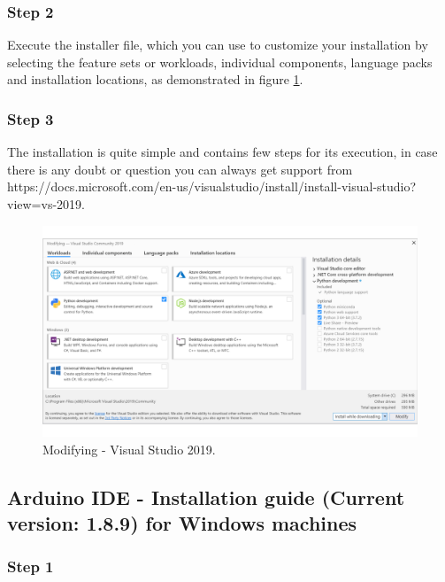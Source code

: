 \begin{refsection}
	
	\subsubsection{Step 2}
	
	Execute the installer file, which you can use to customize your installation by selecting the feature sets or workloads, individual components, language packs and installation locations, as demonstrated in figure \ref{vstudioWorkloads}.
	
	
	
	\subsubsection{Step 3}
	
	The installation is quite simple and contains few steps for its execution, in case there is any doubt or question you can always get support from https://docs.microsoft.com/en-us/visualstudio/install/install-visual-studio?view=vs-2019.
	
	\begin{figure}[H]
		\centering
		\includegraphics[width=1\linewidth]{./sdf/arduino_quantum_rx/figures/VSworkloads.pdf}
		\caption{Modifying - Visual Studio 2019.}
		\label{vstudioWorkloads}
	\end{figure}
	
	\subsection{Arduino IDE - Installation guide (Current version: 1.8.9) for Windows machines}
	
	\subsubsection{Step 1}
	

\end{refsection}
